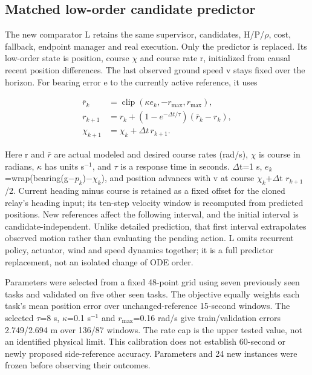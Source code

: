 \documentclass[conference]{IEEEtran}
\begin{document}
\subsection{Matched low-order candidate predictor}

The new comparator L retains the same supervisor, candidates, H/P/\ensuremath{\rho}, cost, fallback, endpoint manager and real execution. Only the predictor is replaced. Its low-order state is position, course \ensuremath{\chi} and course rate r, initialized from causal recent position differences. The last observed ground speed v stays fixed over the horizon. For bearing error e to the currently active reference, it uses

\begin{equation}\label{eq:6}
\begin{aligned}\bar r_k&=\operatorname{clip}(\kappa e_k,-r_{\max},r_{\max}),\\r_{k+1}&=r_k+(1-e^{-\Delta t/\tau})(\bar r_k-r_k),\\\chi_{k+1}&=\chi_k+\Delta t\,r_{k+1}.\end{aligned}
\end{equation}

Here r and $\bar r$ are actual modeled and desired course rates (rad/s), \ensuremath{\chi} is course in radians, \ensuremath{\kappa} has units s$^{-1}$, and \ensuremath{\tau} is a response time in seconds. \ensuremath{\Delta}t=1 s, $e_k$=wrap(bearing(g\ensuremath{-}$p_k$)\ensuremath{-}$\chi_k$), and position advances with v at course $\chi_k$+\ensuremath{\Delta}t $r_{k+1}$/2. Current heading minus course is retained as a fixed offset for the cloned relay's heading input; its ten-step velocity window is recomputed from predicted positions. New references affect the following interval, and the initial interval is candidate-independent. Unlike detailed prediction, that first interval extrapolates observed motion rather than evaluating the pending action. L omits recurrent policy, actuator, wind and speed dynamics together; it is a full predictor replacement, not an isolated change of ODE order.

Parameters were selected from a fixed 48-point grid using seven previously seen tasks and validated on five other seen tasks. The objective equally weights each task's mean position error over unchanged-reference 15-second windows. The selected \ensuremath{\tau}=8 s, \ensuremath{\kappa}=0.1 s$^{-1}$ and $r_{\max}$=0.16 rad/s give train/validation errors 2.749/2.694 m over 136/87 windows. The rate cap is the upper tested value, not an identified physical limit. This calibration does not establish 60-second or newly proposed side-reference accuracy. Parameters and 24 new instances were frozen before observing their outcomes.
\end{document}

